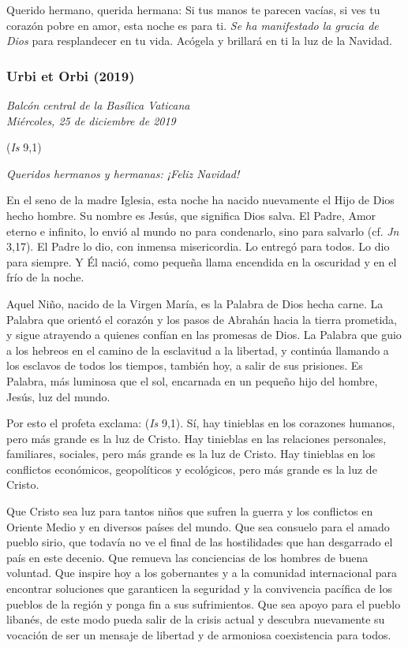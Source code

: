 \begin{body}
\begin{body}
Querido hermano, querida hermana: Si tus manos te parecen vacías, si ves tu corazón pobre en amor, esta noche es para ti. \emph{Se ha manifestado la gracia de Dios} para resplandecer en tu vida. Acógela y brillará en ti la luz de la Navidad.


\subsubsection{Urbi et Orbi (2019)} \emph{Balcón central de la Basílica Vaticana\\ Miércoles, 25 de diciembre de 2019}





 (\emph{Is} 9,1)

\emph{Queridos hermanos y hermanas: ¡Feliz Navidad!}

En el seno de la madre Iglesia, esta noche ha nacido nuevamente el Hijo de Dios hecho hombre. Su nombre es Jesús, que significa Dios salva. El Padre, Amor eterno e infinito, lo envió al mundo no para condenarlo, sino para salvarlo (cf. \emph{Jn} 3,17). El Padre lo dio, con inmensa misericordia. Lo entregó para todos. Lo dio para siempre. Y Él nació, como pequeña llama encendida en la oscuridad y en el frío de la noche.

Aquel Niño, nacido de la Virgen María, es la Palabra de Dios hecha carne. La Palabra que orientó el corazón y los pasos de Abrahán hacia la tierra prometida, y sigue atrayendo a quienes confían en las promesas de Dios. La Palabra que guio a los hebreos en el camino de la esclavitud a la libertad, y continúa llamando a los esclavos de todos los tiempos, también hoy, a salir de sus prisiones. Es Palabra, más luminosa que el sol, encarnada en un pequeño hijo del hombre, Jesús, luz del mundo.

Por esto el profeta exclama:  (\emph{Is} 9,1). Sí, hay tinieblas en los corazones humanos, pero más grande es la luz de Cristo. Hay tinieblas en las relaciones personales, familiares, sociales, pero más grande es la luz de Cristo. Hay tinieblas en los conflictos económicos, geopolíticos y ecológicos, pero más grande es la luz de Cristo.

Que Cristo sea luz para tantos niños que sufren la guerra y los conflictos en Oriente Medio y en diversos países del mundo. Que sea consuelo para el amado pueblo sirio, que todavía no ve el final de las hostilidades que han desgarrado el país en este decenio. Que remueva las conciencias de los hombres de buena voluntad. Que inspire hoy a los gobernantes y a la comunidad internacional para encontrar soluciones que garanticen la seguridad y la convivencia pacífica de los pueblos de la región y ponga fin a sus sufrimientos. Que sea apoyo para el pueblo libanés, de este modo pueda salir de la crisis actual y descubra nuevamente su vocación de ser un mensaje de libertad y de armoniosa coexistencia para todos.


\end{body}
\end{body}
